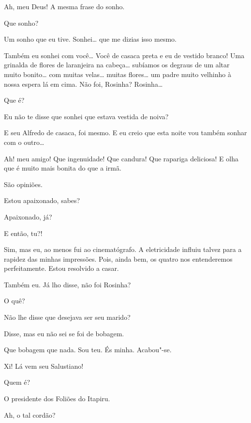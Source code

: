  Ah, meu Deus! A
mesma frase do sonho.

 Que sonho?

 Um sonho que eu
tive. Sonhei\ldots{} que me dizias isso mesmo.

 Também eu sonhei
com você\ldots{} Você de casaca preta e eu de vestido
branco! Uma grinalda de flores de laranjeira na cabeça\ldots{} 
subíamos os degraus de um altar muito bonito\ldots{} com muitas
velas\ldots{} muitas flores\ldots{} um padre muito velhinho à
nossa espera lá em cima.  Não foi, Rosinha?
 Rosinha\ldots{}

   Que é?

 Eu não te disse que sonhei que estava vestida de noiva?

 E seu Alfredo de
casaca, foi mesmo. E eu creio que esta noite vou também
sonhar com o outro\ldots{}

  Ah!
meu amigo! Que ingenuidade! Que candura! Que rapariga deliciosa! E olha
que é muito mais bonita do que a irmã.

 São opiniões.

 Estou apaixonado,
sabes?

 Apaixonado, já?

 E então, tu?!

 Sim, mas eu, ao
menos fui ao cinematógrafo. A eletricidade influiu
talvez para a rapidez das minhas impressões. Pois,
ainda bem, os quatro nos entenderemos perfeitamente. Estou
resolvido a casar.

 Também eu. Já lho
disse,  não foi Rosinha?

 O quê?

 Não lhe disse que
desejava ser seu marido?

 Disse, mas eu
não sei se foi de bobagem.  

 Que
bobagem que nada. Sou teu. És minha. Acabou"-se.

 Xi! Lá
vem seu Salustiano!

 Quem é?

 O presidente dos Foliões do Itapiru.

 Ah, o tal cordão?

